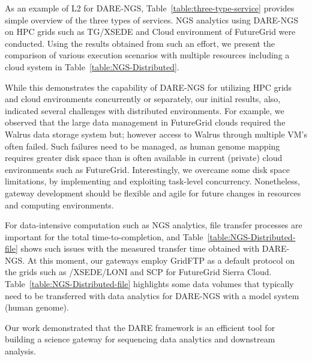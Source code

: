 \documentclass[]{svjour3}
\begin{document}
As an example of L2 for DARE-NGS, Table~\ref{table:three-type-service}
provides simple overview of the three types of services.
NGS analytics using DARE-NGS on HPC grids such as TG/XSEDE and Cloud
environment of FutureGrid were conducted\cite{dare-ecmls11}. Using the
results obtained from such an effort, we present the comparison of
various execution scenarios with multiple resources including a cloud
system in Table~\ref{table:NGS-Distributed}. 

While this demonstrates the capability of DARE-NGS for utilizing HPC
grids and cloud environments concurrently or separately, our initial
results, also, indicated several challenges with distributed
environments. For example, we observed that the large data management
in FutureGrid clouds required the Walrus data storage system but;
however access to Walrus through multiple VM's often failed.  Such
failures need to be managed, as human genome mapping requires greater
disk space than is often available in current (private) cloud
environments such as FutureGrid. Interestingly, we overcame some disk
space limitations, by implementing and exploiting task-level
concurrency. Nonetheless, gateway development should be flexible and
agile for future changes in resources and computing environments.

For data-intensive computation such as NGS analytics, file transfer
processes are important for the total time-to-completion, and
Table~\ref{table:NGS-Distributed-file} shows such issues with the
measured transfer time obtained with DARE-NGS. At this moment, our
gateways employ GridFTP as a default protocol on the grids such as
/XSEDE/LONI and SCP for FutureGrid Sierra Cloud.
Table~\ref{table:NGS-Distributed-file} highlights some data volumes
that typically need to be transferred with data analytics for DARE-NGS
with a model system (human genome).



Our
work demonstrated that the DARE framework is an efficient tool for
building a science gateway for sequencing data analytics and
downstream analysis.
\end{document}
